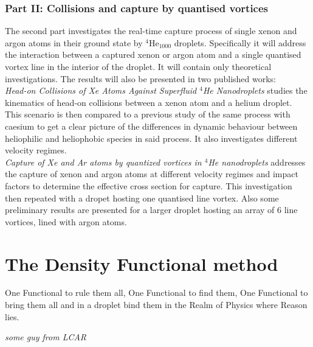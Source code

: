 \documentclass[12pt,a4paper,twosides]{book}
\begin{document}
		\subsection{Part II: Collisions and capture by quantised vortices}
			The second part investigates the real-time capture process of single xenon and argon atoms in their ground state by $^4$He$_{1000}$ droplets. Specifically it will address the interaction between a captured xenon or argon atom and a single quantised vortex line in the interior of the droplet. It will contain only theoretical investigations. The results will also be presented in two published works:\\
		
			\emph{Head-on Collisions of Xe Atoms Against Superfluid $^4\!$He Nanodroplets} studies the kinematics of head-on collisions between a xenon atom and a helium droplet. This scenario is then compared to a previous study of the same process with caesium to get a clear picture of the differences in dynamic behaviour between heliophilic and heliophobic species in said process. It also investigates different velocity regimes.\\
		
			\emph{Capture of Xe and Ar atoms by quantized vortices in $^4\!$He nanodroplets} addresses the capture of xenon and argon atoms at different velocity regimes and impact factors to determine the effective cross section for capture. This investigation then repeated with a dropet hosting one quantised line vortex. Also some preliminary results are presented for a larger droplet hosting an array of 6 line vortices, lined with argon atoms.

\chapter{The Density Functional method}\label{sec:dft-method}
	\epigraph{One Functional to rule them all,
				One Functional to find them,
				One Functional to bring them all
				and in a droplet bind them
				in the Realm of Physics where Reason lies.}{\textit{some guy from LCAR}}
\end{document}
